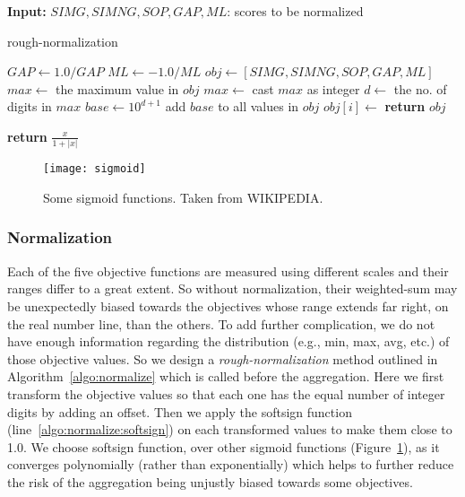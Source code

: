 \begin{algorithm}[!htbp]%
	\scriptsize
	\textbf{Input:} $SIMG, SIMNG, SOP, GAP, ML$: scores to be normalized
	\begin{algorithmic}[1]
		\caption{rough-normalization}
		\label{algo:normalize}
		\State $GAP \gets 1.0/GAP$ 
		\State $ML \gets -1.0/ML$ 
		\State $ obj \gets [SIMG, SIMNG, SOP, GAP, ML]$
		\State $max \gets$ the maximum value in $obj$
		\State $max \gets$ cast $max$ as integer
		\State $d \gets$ the no. of digits in $max$
		\State $ base \gets 10^{d+1}$
		\State add $base$ to all values in $obj$
		\State $obj[i] \gets $ 
		\EndFor
		\State \textbf{return} $obj$
		\Statex
		
		 \label{algo:normalize:softsign}
		\State \textbf{return} $ \frac{x}{1 + |x|} $
		\EndFunction
	\end{algorithmic}
\end{algorithm}

\begin{figure}[!htbp]%
	\texttt{[image: sigmoid]}
	\caption{Some sigmoid functions. Taken from WIKIPEDIA.}
	\label{fig:sigmoid}
\end{figure}

\subsubsection{Normalization}
Each of the five objective functions are measured using different scales and their ranges differ to a great extent. So without normalization, their weighted-sum may be unexpectedly biased towards the objectives whose range extends far right, on the real number line, than the others. To add further complication, we do not have enough information regarding the distribution (e.g., min, max, avg, etc.) of those objective values. So we design a \textit{rough-normalization} method outlined in Algorithm~\ref{algo:normalize} which is called before the aggregation. Here we first transform the objective values so that each one has the equal number of integer digits by adding an offset. Then we apply the softsign function (line~\ref{algo:normalize:softsign}) on each transformed values to make them close to 1.0. We choose softsign function, over other sigmoid functions (Figure~\ref{fig:sigmoid}), as it converges polynomially (rather than exponentially) which helps to further reduce the risk of the aggregation being unjustly biased towards some objectives. %


